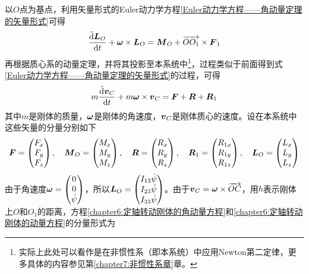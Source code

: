 以$O$点为基点，利用矢量形式的Euler动力学方程\eqref{Euler动力学方程——角动量定理的矢量形式}可得
\begin{equation}
	\frac{\tilde{\mathrm{d}} \boldsymbol{L}_O}{\mathrm{d} t} + \boldsymbol{\omega} \times \boldsymbol{L}_O = \boldsymbol{M}_O+\overrightarrow{OO_1}\times \boldsymbol{F}_1
	\label{chapter6:定轴转动刚体的角动量方程}
\end{equation}
再根据质心系的动量定理，并将其投影至本系统中\footnote{实际上此处可以看作是在非惯性系（即本系统）中应用Newton第二定律，更多具体的内容参见第\ref{chapter7:非惯性系章}章。}，过程类似于前面得到式\eqref{Euler动力学方程——角动量定理的矢量形式}的过程，可得
\begin{equation}
	m\frac{\tilde{\mathrm{d}} \boldsymbol{v}_C}{\mathrm{d} t} + m\boldsymbol{\omega} \times \boldsymbol{v}_C = \boldsymbol{F}+\boldsymbol{R}+\boldsymbol{R}_1
	\label{chapter6:定轴转动刚体的动量方程}
\end{equation}
其中$m$是刚体的质量，$\boldsymbol{\omega}$是刚体的角速度，$\boldsymbol{v}_C$是刚体质心的速度。设在本系统中这些矢量的分量分别如下
\begin{align*}
	\boldsymbol{F}=\begin{pmatrix} F_x \\ F_y \\ F_z \end{pmatrix},\quad \boldsymbol{M}_O=\begin{pmatrix} M_x \\ M_y \\ M_z \end{pmatrix},\quad \boldsymbol{R}=\begin{pmatrix} R_x \\ R_y \\ R_z \end{pmatrix},\quad \boldsymbol{R}_1=\begin{pmatrix} R_{1x} \\ R_{1y} \\ R_{1z} \end{pmatrix},\quad \boldsymbol{L}_O=\begin{pmatrix} L_x \\ L_y \\ L_z \end{pmatrix}
\end{align*}
由于角速度$\boldsymbol{\omega}=\begin{pmatrix} 0 \\ 0 \\ \dot{\psi} \end{pmatrix}$，所以$\boldsymbol{L}_O=\begin{pmatrix} I_{13}\dot{\psi} \\ I_{23}\dot{\psi} \\ I_{33}\dot{\psi} \end{pmatrix}$。由于$\boldsymbol{v}_C=\boldsymbol{\omega}\times\overrightarrow{OC}$，用$h$表示刚体上$O$和$O_1$的距离，方程\eqref{chapter6:定轴转动刚体的角动量方程}和\eqref{chapter6:定轴转动刚体的动量方程}的分量形式为
